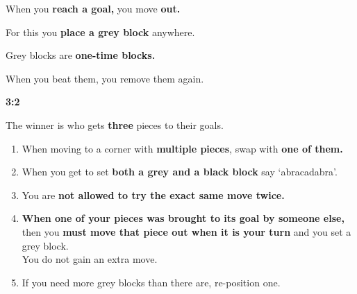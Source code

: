     When you \textbf{reach a goal,} you move \textbf{out. }
    
    
    For this you \textbf{place a grey block} anywhere.
    
    Grey blocks are \textbf{one-time blocks.}
    
    When you beat them, you remove them again.
    
  

%
    
    
    \textbf{3:2}
    
        
    The winner is who gets \textbf{three} pieces to their goals.



    \raggedright
    
    

    \begin{enumerate}[leftmargin=*]
    \setlength\itemsep{0em}
        \item When moving to a corner with \textbf{multiple pieces}, swap with \textbf{one of them.}
        \item When you get to set \textbf{both a grey and a black block} say `abracadabra'.
        \item You are \textbf{not allowed to try the exact same move twice.}        
        \item \textbf{When one of your pieces was brought to its goal by someone else, }then you \textbf{must move that piece out when it is your turn} and you set a grey block.\\ You do not gain an extra move.
        \item If you need more grey blocks than there are, re-position one.
    \end{enumerate}


